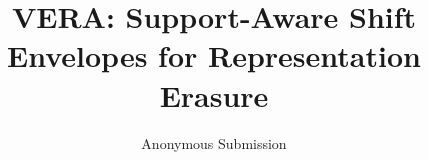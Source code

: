 \documentclass[letterpaper]{article}
\title{VERA: Support-Aware Shift Envelopes for Representation Erasure}
\author{Anonymous Submission}
\begin{document}
\maketitle
{}

\label{vera-last-content-page}

\end{document}
